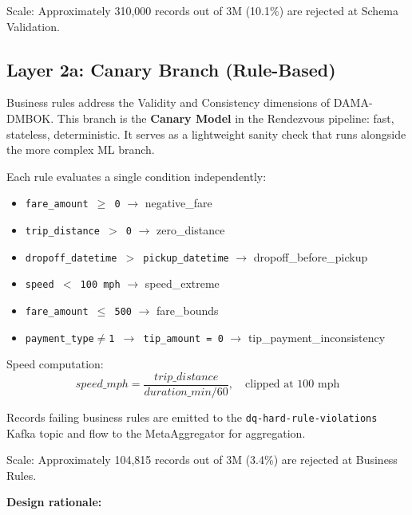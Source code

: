 Scale: Approximately 310,000 records out of 3M (10.1\%) are rejected at Schema Validation.

\subsection{Layer 2a: Canary Branch (Rule-Based)}

Business rules address the Validity and Consistency dimensions of DAMA-DMBOK. This branch is the \textbf{Canary Model} in the Rendezvous pipeline: fast, stateless, deterministic. It serves as a lightweight sanity check that runs alongside the more complex ML branch.

Each rule evaluates a single condition independently:

\begin{itemize}
    \item \texttt{fare\_amount $\geq$ 0} $\to$ negative\_fare
    \item \texttt{trip\_distance $>$ 0} $\to$ zero\_distance
    \item \texttt{dropoff\_datetime $>$ pickup\_datetime} $\to$ dropoff\_before\_pickup
    \item \texttt{speed $<$ 100 mph} $\to$ speed\_extreme
    \item \texttt{fare\_amount $\leq$ 500} $\to$ fare\_bounds
    \item \texttt{payment\_type$\neq$1 $\to$ tip\_amount = 0} $\to$ tip\_payment\_inconsistency
\end{itemize}

Speed computation:
\begin{equation}
speed\_mph = \frac{trip\_distance}{duration\_min / 60}, \quad \text{clipped at 100 mph}
\end{equation}

Records failing business rules are emitted to the \texttt{dq-hard-rule-violations} Kafka topic and flow to the MetaAggregator for aggregation.

Scale: Approximately 104,815 records out of 3M (3.4\%) are rejected at Business Rules.

\textbf{Design rationale:}

